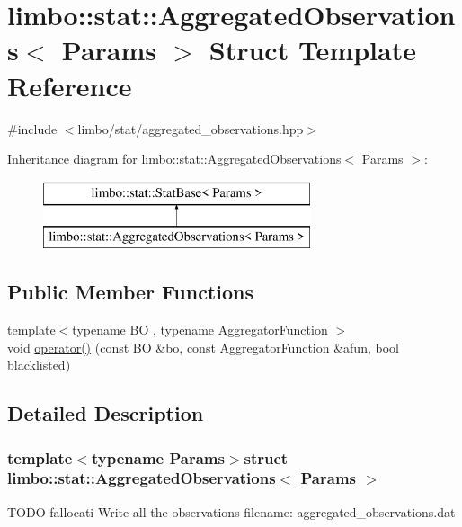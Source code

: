 \hypertarget{structlimbo_1_1stat_1_1_aggregated_observations}{}\section{limbo\+:\+:stat\+:\+:Aggregated\+Observations$<$ Params $>$ Struct Template Reference}
\label{structlimbo_1_1stat_1_1_aggregated_observations}


{\ttfamily \#include $<$limbo/stat/aggregated\+\_\+observations.\+hpp$>$}

Inheritance diagram for limbo\+:\+:stat\+:\+:Aggregated\+Observations$<$ Params $>$\+:\begin{figure}[H]
\begin{center}
\leavevmode
\includegraphics[height=2.000000cm]{structlimbo_1_1stat_1_1_aggregated_observations}
\end{center}
\end{figure}
\subsection*{Public Member Functions}
\begin{DoxyCompactItemize}
\item 
{\footnotesize template$<$typename B\+O , typename Aggregator\+Function $>$ }\\void \hyperlink{structlimbo_1_1stat_1_1_aggregated_observations_a859ec9c24060990d4bbf976485d57bf6}{operator()} (const B\+O \&bo, const Aggregator\+Function \&afun, bool blacklisted)
\end{DoxyCompactItemize}


\subsection{Detailed Description}
\subsubsection*{template$<$typename Params$>$struct limbo\+::stat\+::\+Aggregated\+Observations$<$ Params $>$}

T\+O\+D\+O fallocati Write all the observations filename\+: {\ttfamily aggregated\+\_\+observations.\+dat} 

